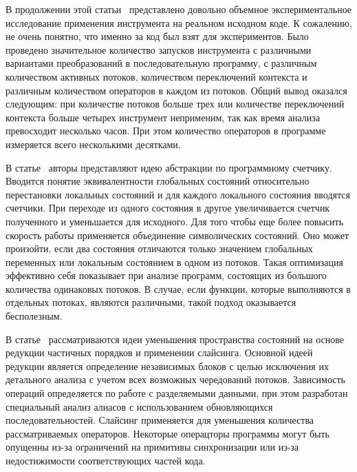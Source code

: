 В продолжении этой статьи~\cite{Ghafari:2010} представлено довольно объемное экспериментальное исследование применения инструмента на реальном исходном коде.
К сожалению, не очень понятно, что именно за код был взят для экспериментов.
Было проведено значительное количество запусков инструмента с различными вариантами преобразований в последовательную программу, с различным количеством активных потоков, количеством переключений контекста и различным количеством операторов в каждом из потоков.
Общий вывод оказался следующим: при количестве потоков больше трех или количестве переключений контекста больше четырех инструмент неприменим, так как время анализа превосходит несколько часов.
При этом количество операторов в программе измеряется всего несколькими десятками.

В статье~\cite{Basler:2009} авторы представляют идею абстракции по программному счетчику.
Вводится понятие эквивалентности глобальных состояний относительно перестановки локальных состояний и для каждого локального состояния вводятся счетчики.
При переходе из одного состояния в другое увеличивается счетчик полученного и уменьшается для исходного. 
Для того чтобы еще более повысить скорость работы применяется объединение символических состояний.
Оно может произойти, если два состояния отличаются только значением глобальных переменных или локальным состоянием в одном из потоков. 
Такая оптимизация эффективно себя показывает при анализе программ, состоящих из большого количества одинаковых потоков.
В случае, если функции, которые выполняются в отдельных потоках, являются различными, такой подход оказывается бесполезным.


В статье~\cite{Kahlon:2009:SRTI} рассматриваются идеи уменьшения пространства состояний на основе редукции частичных порядков и применении слайсинга.
Основной идеей редукции является определение независимых блоков с целью исключения их детального анализа с учетом всех возможных чередований потоков.
Зависимость операций определяется по работе с разделяемыми данными, при этом разработан специальный анализ алиасов с использованием обновляющихся последовательностей.
Слайсинг применяется для уменьшения количества рассматриваемых операторов. Некоторые операцторы программы могут быть опущенны из-за ограничений на примитивы синхронизации или из-за недостижимости соответствующих частей кода.

